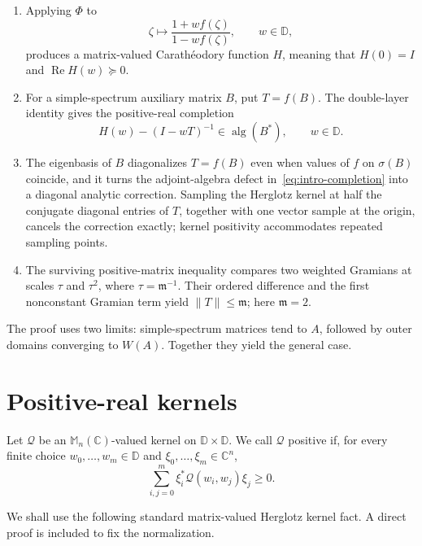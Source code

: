 \documentclass[preprints,article,submit,oneauthor]{Definitions/mdpi}
\theoremstyle{mdpi}
\theoremstyle{definition}
\newcommand{\C}{\mathbb C}
\newcommand{\D}{\mathbb D}
\newcommand{\Mn}{\mathbb M_n(\C)}
\newcommand{\alg}{\operatorname{alg}}
\newcommand{\RePart}{\operatorname{Re}}
\begin{document}
\begin{enumerate}
\item Applying $\Phi$ to
\[
  \zeta\longmapsto\frac{1+w f(\zeta)}{1-w f(\zeta)},
  \qquad w\in\D,
\]
produces a matrix-valued Carath\'eodory function $H$, meaning that
$H(0)=I$ and $\RePart H(w)\succeq0$.

\item For a simple-spectrum auxiliary matrix $B$, put $T=f(B)$.  The
double-layer identity gives the positive-real completion
\begin{equation}
  H(w)-(I-wT)^{-1}\in\alg(B^*),\qquad w\in\D.
  \label{eq:intro-completion}
\end{equation}

\item The eigenbasis of $B$ diagonalizes $T=f(B)$ even when values of
$f$ on $\sigma(B)$ coincide, and it turns the adjoint-algebra defect
in~\eqref{eq:intro-completion} into a diagonal analytic correction.
Sampling the Herglotz kernel at half the conjugate diagonal entries of
$T$, together with one vector sample at the origin, cancels the
correction exactly; kernel positivity accommodates repeated sampling
points.

\item The surviving positive-matrix inequality compares two weighted
Gramians at scales $\tau$ and $\tau^2$, where
$\tau=\mathfrak m^{-1}$.  Their ordered difference and the first
nonconstant Gramian term yield $\lVert T\rVert\leq\mathfrak m$; here
$\mathfrak m=2$.
\end{enumerate}

The proof uses two limits: simple-spectrum matrices tend to $A$,
followed by outer domains converging to $W(A)$.  Together they yield
the general case.

\section{Positive-real kernels}
\label{sec:herglotz}

Let $\mathcal Q$ be an $\Mn$-valued kernel on $\D\times\D$.  We call
$\mathcal Q$ positive if, for every finite choice
$w_0,\ldots,w_m\in\D$ and $\xi_0,\ldots,\xi_m\in\C^n$,
\begin{equation}
  \sum_{i,j=0}^m
  \xi_i^*\mathcal Q(w_i,w_j)\xi_j\geq0.
  \label{eq:positive-kernel-definition}
\end{equation}

We shall use the following standard matrix-valued Herglotz kernel
fact.  A direct proof is included to fix the normalization.
\end{document}
